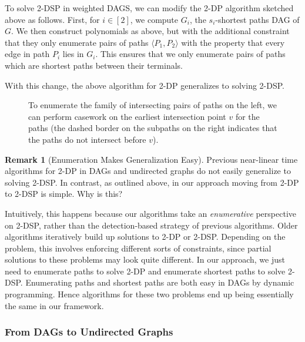\documentclass[11pt]{article}
\theoremstyle{definition}
\newtheorem{remark}[theorem]{Remark}
\begin{document}
To solve \textsf{2-DSP} in weighted DAGS, we can modify the \textsf{2-DP} algorithm sketched above as follows.
First, for $i\in [2]$, we compute $G_i$, the $s_i$-shortest paths DAG of $G$.
We then construct polynomials as above, but with the additional constraint that they only enumerate pairs of paths $\langle P_1,P_2\rangle$ with the property that every edge in path $P_i$ lies in $G_i$.
This ensures that we only enumerate pairs of paths which are shortest paths between their terminals.

With this change, the above algorithm for \textsf{2-DP} generalizes to solving \textsf{2-DSP}. 


\begin{figure}[t]
    \centering
    
    \caption{To enumerate the family of intersecting pairs of paths on the left, we can perform casework on the earliest intersection point $v$ for the paths (the dashed border on the subpaths on the right indicates that the paths do not intersect before $v$). }
    \label{fig:intersection-casework}
\end{figure}

\begin{remark}[Enumeration Makes Generalization Easy]
Previous near-linear time algorithms for \textsf{2-DP} in DAGs and undirected graphs do not easily generalize to solving \textsf{2-DSP}.
In contrast, as outlined above, in our approach moving from \textsf{2-DP} to \textsf{2-DSP} is simple.
Why is this?

Intuitively, this happens because our algorithms take an \emph{enumerative} perspective on \textsf{2-DSP}, rather than the detection-based strategy of previous algorithms.
Older algorithms iteratively build up solutions to \textsf{2-DP} or \textsf{2-DSP}. 
Depending on the problem, this involves enforcing different sorts of constraints, since partial solutions to these problems may look quite different. 
In our approach, we just need to enumerate paths to solve \textsf{2-DP} and enumerate shortest paths to solve \textsf{2-DSP}.
Enumerating paths and shortest paths are both easy in DAGs by dynamic programming.
Hence algorithms for these two problems end up being essentially the same in our framework.
\end{remark}



\subsubsection*{From DAGs to Undirected Graphs}
\end{document}
